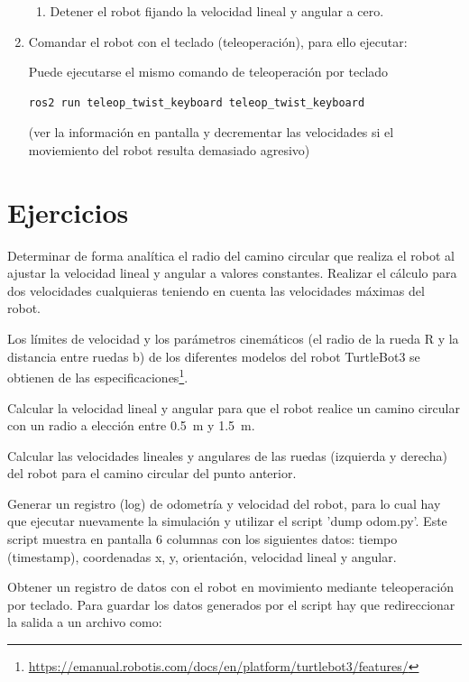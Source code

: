 \documentclass[tp]{lcc}
\begin{document}
\begin{enumerate}
\begin{enumerate}
	\item Detener el robot fijando la velocidad lineal y angular a cero.
	\end{enumerate}

\item Comandar el robot con el teclado (teleoperación), para ello ejecutar:

Puede ejecutarse el mismo comando de teleoperación por teclado
\begin{lstlisting}[style=bash] 
ros2 run teleop_twist_keyboard teleop_twist_keyboard
\end{lstlisting}
(ver la información en pantalla y decrementar las velocidades si el moviemiento del robot
resulta demasiado agresivo)
\end{enumerate}


\section{Ejercicios}

\ejercicio  Determinar de forma analítica el radio del camino circular que realiza el robot al ajustar la velocidad lineal y angular a valores constantes. Realizar el cálculo para dos velocidades cualquieras teniendo en cuenta las velocidades máximas del robot.

\begin{nota}
	Los límites de velocidad y los parámetros cinemáticos (el radio de la rueda R y la distancia entre ruedas b) de los diferentes modelos del robot TurtleBot3 se obtienen de las especificaciones\footnote{\url{https://emanual.robotis.com/docs/en/platform/turtlebot3/features/}}.
\end{nota}

\ejercicio  Calcular la velocidad lineal y angular para que el robot realice un camino circular con un radio a elección entre \SI{0.5}{\meter} y \SI{1.5}{\meter}.

\ejercicio  Calcular las velocidades lineales y angulares de las ruedas (izquierda y derecha) del robot para el camino circular del punto anterior.

\ejercicio Generar un registro (log) de odometría y velocidad del robot, para lo cual hay que ejecutar nuevamente
la simulación y utilizar el script ’dump odom.py’. Este script muestra en pantalla 6 columnas con los siguientes datos: tiempo (timestamp), coordenadas x, y, orientación, velocidad lineal y angular.

\ejercicio Obtener un registro de datos con el robot en movimiento mediante teleoperación por teclado. Para guardar los datos generados por el script hay que redireccionar la salida a un archivo como:
\end{document}
